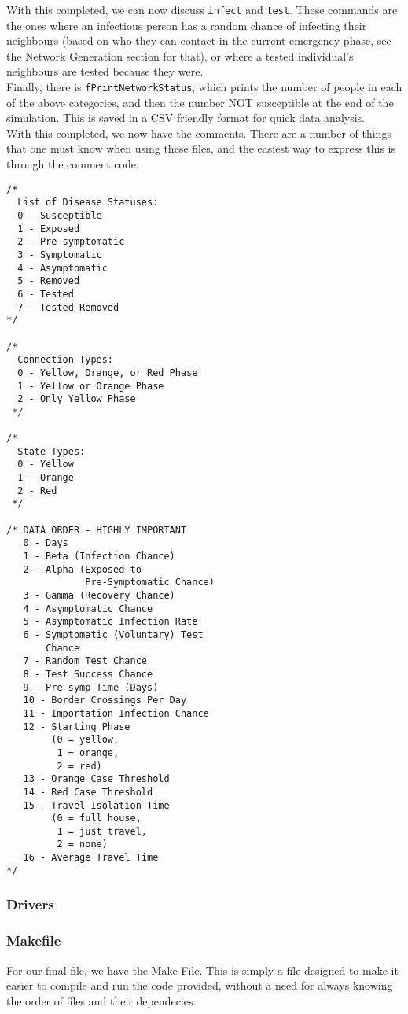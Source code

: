 \documentclass{article}
\numberwithin{equation}{section} %
\theoremstyle{definition}
\begin{document}
\begin{multicols*}{2}
With this completed, we can now discuss \lstinline{infect} and \lstinline{test}. These commands are the ones where an infectious person has a random chance of infecting their neighbours (based on who they can contact in the current emergency phase, see the Network Generation section for that), or where a tested individual's neighbours are tested because they were. \\

Finally, there is \lstinline{fPrintNetworkStatus}, which prints the number of people in each of the above categories, and then the number NOT susceptible at the end of the simulation. This is saved in a CSV friendly format for quick data analysis. \\

With this completed, we now have the comments. There are a number of things that one must know when using these files, and the easiest way to express this is through the comment code:
\begin{lstlisting}
/*
  List of Disease Statuses:
  0 - Susceptible
  1 - Exposed
  2 - Pre-symptomatic
  3 - Symptomatic
  4 - Asymptomatic
  5 - Removed
  6 - Tested
  7 - Tested Removed
*/

/*
  Connection Types:
  0 - Yellow, Orange, or Red Phase
  1 - Yellow or Orange Phase
  2 - Only Yellow Phase
 */

/*
  State Types:
  0 - Yellow
  1 - Orange 
  2 - Red
 */

/* DATA ORDER - HIGHLY IMPORTANT
   0 - Days
   1 - Beta (Infection Chance)
   2 - Alpha (Exposed to
              Pre-Symptomatic Chance)
   3 - Gamma (Recovery Chance)
   4 - Asymptomatic Chance
   5 - Asymptomatic Infection Rate
   6 - Symptomatic (Voluntary) Test
       Chance
   7 - Random Test Chance
   8 - Test Success Chance
   9 - Pre-symp Time (Days)
   10 - Border Crossings Per Day
   11 - Importation Infection Chance
   12 - Starting Phase
        (0 = yellow,
         1 = orange,
         2 = red)
   13 - Orange Case Threshold
   14 - Red Case Threshold 
   15 - Travel Isolation Time
        (0 = full house,
         1 = just travel,
         2 = none)
   16 - Average Travel Time
*/
\end{lstlisting}

\subsubsection{Drivers}

\subsubsection{Makefile}
For our final file, we have the Make File. This is simply a file designed to make it easier to compile and run the code provided, without a need for always knowing the order of files and their dependecies. \\


\end{multicols*}
\end{document}
